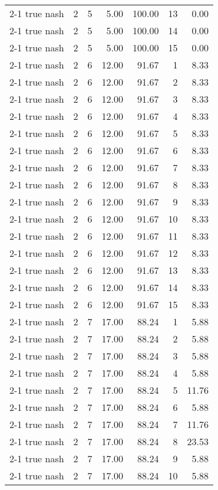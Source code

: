 \begin{tabular}{lrrrrrr}
2-1  true nash & 2 & 5 & 5.00 & 100.00 & 13 & 0.00 \\
2-1  true nash & 2 & 5 & 5.00 & 100.00 & 14 & 0.00 \\
2-1  true nash & 2 & 5 & 5.00 & 100.00 & 15 & 0.00 \\
2-1  true nash & 2 & 6 & 12.00 & 91.67 & 1 & 8.33 \\
2-1  true nash & 2 & 6 & 12.00 & 91.67 & 2 & 8.33 \\
2-1  true nash & 2 & 6 & 12.00 & 91.67 & 3 & 8.33 \\
2-1  true nash & 2 & 6 & 12.00 & 91.67 & 4 & 8.33 \\
2-1  true nash & 2 & 6 & 12.00 & 91.67 & 5 & 8.33 \\
2-1  true nash & 2 & 6 & 12.00 & 91.67 & 6 & 8.33 \\
2-1  true nash & 2 & 6 & 12.00 & 91.67 & 7 & 8.33 \\
2-1  true nash & 2 & 6 & 12.00 & 91.67 & 8 & 8.33 \\
2-1  true nash & 2 & 6 & 12.00 & 91.67 & 9 & 8.33 \\
2-1  true nash & 2 & 6 & 12.00 & 91.67 & 10 & 8.33 \\
2-1  true nash & 2 & 6 & 12.00 & 91.67 & 11 & 8.33 \\
2-1  true nash & 2 & 6 & 12.00 & 91.67 & 12 & 8.33 \\
2-1  true nash & 2 & 6 & 12.00 & 91.67 & 13 & 8.33 \\
2-1  true nash & 2 & 6 & 12.00 & 91.67 & 14 & 8.33 \\
2-1  true nash & 2 & 6 & 12.00 & 91.67 & 15 & 8.33 \\
2-1  true nash & 2 & 7 & 17.00 & 88.24 & 1 & 5.88 \\
2-1  true nash & 2 & 7 & 17.00 & 88.24 & 2 & 5.88 \\
2-1  true nash & 2 & 7 & 17.00 & 88.24 & 3 & 5.88 \\
2-1  true nash & 2 & 7 & 17.00 & 88.24 & 4 & 5.88 \\
2-1  true nash & 2 & 7 & 17.00 & 88.24 & 5 & 11.76 \\
2-1  true nash & 2 & 7 & 17.00 & 88.24 & 6 & 5.88 \\
2-1  true nash & 2 & 7 & 17.00 & 88.24 & 7 & 11.76 \\
2-1  true nash & 2 & 7 & 17.00 & 88.24 & 8 & 23.53 \\
2-1  true nash & 2 & 7 & 17.00 & 88.24 & 9 & 5.88 \\
2-1  true nash & 2 & 7 & 17.00 & 88.24 & 10 & 5.88 \\

\end{tabular}
